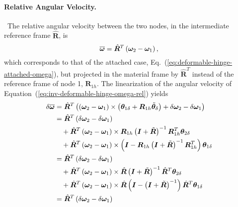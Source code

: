 \documentclass[10pt,dvips,fleqn,subeqn]{report}
\newcommand{\T}[1]{\bm{#1}}
\newcommand{\TT}[1]{\bm{#1}}
\begin{document}
\paragraph{Relative Angular Velocity.} \
The relative angular velocity between the two nodes,
in the intermediate reference frame $\hat{\T{R}}$, is
\begin{equation}
	\overline{\T{\omega}} = \hat{\T{R}}^T \plbr{\T{\omega}_2 - \T{\omega}_1}
	\label{eq:inv-deformable-hinge-omega-rel} ,
\end{equation}
which corresponds to that of the attached case,
Eq.~(\ref{eq:deformable-hinge-attached-omega}),
but projected in the material frame by $\hat{\TT{R}}^T$
instead of the reference frame of node 1, $\T{R}_{1h}$.
The linearization of the angular velocity 
of Equation~(\ref{eq:inv-deformable-hinge-omega-rel}) yields
\begin{align}
	\delta\overline{\T{\omega}}
	&= \hat{\T{R}}^T \plbr{
		\plbr{\T{\omega}_2 - \T{\omega}_1} \times \plbr{\T{\theta}_{1\delta} + \T{R}_{1h} \tilde{\T{\theta}}_{\delta}}
		+ \delta\T{\omega}_2 - \delta\T{\omega}_1
	} \nonumber \\
	&= \hat{\T{R}}^T \plbr{
		\delta\T{\omega}_2 - \delta\T{\omega}_1
	} \nonumber \\
	& \mbox{\hspace{10pt}} + \hat{\T{R}}^T \plbr{\T{\omega}_2 - \T{\omega}_1} \times 
			\T{R}_{1h}\plbr{\T{I} + \tilde{\T{R}}}^{-1} \T{R}_{1h}^T \T{\theta}_{2\delta} \nonumber \\
	& \mbox{\hspace{10pt}} + \hat{\T{R}}^T \plbr{\T{\omega}_2 - \T{\omega}_1} \times
			\plbr{\T{I} - \T{R}_{1h}\plbr{\T{I} + \tilde{\T{R}}}^{-1} \T{R}_{1h}^T} \T{\theta}_{1\delta} \nonumber \\
	&= \hat{\T{R}}^T \plbr{
		\delta\T{\omega}_2 - \delta\T{\omega}_1
	} \nonumber \\
	& \mbox{\hspace{10pt}} + \hat{\T{R}}^T \plbr{\T{\omega}_2 - \T{\omega}_1} \times 
			\hat{\T{R}}\plbr{\T{I} + \tilde{\T{R}}}^{-1} \hat{\T{R}}^T \T{\theta}_{2\delta} \nonumber \\
	& \mbox{\hspace{10pt}} + \hat{\T{R}}^T \plbr{\T{\omega}_2 - \T{\omega}_1} \times
			\hat{\T{R}}\plbr{\T{I} - \plbr{\T{I} + \tilde{\T{R}}}^{-1}} \hat{\T{R}}^T \T{\theta}_{1\delta} \nonumber \\
	&= \hat{\T{R}}^T \plbr{
		\delta\T{\omega}_2 - \delta\T{\omega}_1
	} \nonumber \\

\end{align}
\end{document}
